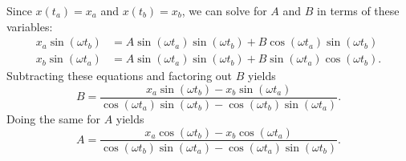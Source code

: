 Since $x(t_a)=x_a$ and $x(t_b)=x_b$, we can solve for $A$ and $B$ in terms of these variables:
\begin{align}
    x_a\sin(\omega t_b)&=A\sin(\omega t_a)\sin(\omega t_b)+B\cos(\omega t_a)\sin(\omega t_b)\\
    x_b\sin(\omega t_a)&=A\sin(\omega t_a)\sin(\omega t_b)+B\sin(\omega t_a)\cos(\omega t_b).
\end{align}
Subtracting these equations and factoring out $B$ yields
\begin{equation}
    \label{B}
    B=\frac{x_a\sin(\omega t_b)-x_b\sin(\omega t_a)}{\cos(\omega t_a)\sin(\omega t_b)-\cos(\omega t_b)\sin(\omega t_a)}.
\end{equation}
Doing the same for $A$ yields
\begin{equation}
    \label{A}
    A=\frac{x_a\cos(\omega t_b)-x_b\cos(\omega t_a)}{\cos(\omega t_b)\sin(\omega t_a)-\cos(\omega t_a)\sin(\omega t_b)}.
\end{equation}

